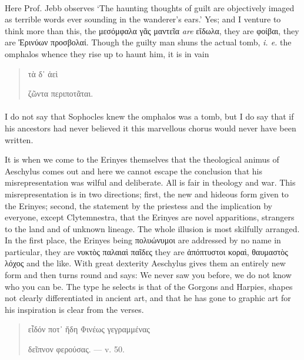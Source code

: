 \documentclass[a4paper, 11pt, oneside, polutonikogreek, english]{article}
\begin{document}
\paragraph{}
Here Prof. Jebb observes `The haunting thoughts of guilt are objectively imaged as terrible words ever sounding in the wanderer's ears.' Yes; and I venture to think more than this, the μεσόμφαλα γᾶς μαντεῖα \emph{are} εἴδωλα, they are φοίβαι, they are Ἐρινύων προσβολαί. Though the guilty man shuns the actual tomb, \emph{i. e.} the omphalos whence they rise up to haunt him, it is in vain
\begin{quotation}
\hspace*{20mm}τὰ δ᾽ ἀεὶ

ζῶντα περιποτᾶται.
\end{quotation}
\paragraph{}
I do not say that Sophocles knew the omphalos was a tomb, but I do say that if his ancestors had never believed it this marvellous chorus would never have been written.

It is when we come to the Erinyes themselves that the theological animus of Aeschylus comes out and here we cannot escape the conclusion that his misrepresentation was wilful and deliberate. All is fair in theology and war. This misrepresentation is in two directions; first, the new and hideous form given to the Erinyes; second, the statement by the priestess and the implication by everyone, except Clytemnestra, that the Erinyes are novel apparitions, strangers to the land and of unknown lineage. The whole illusion is most skilfully arranged. In the first place, the Erinyes being πολυώνυμοι are addressed by no name in particular, they are νυκτὸς παλαιαὶ παῖδες they are ἀπόπτυστοι κοραὶ, θαυμαστὸς λόχος and the like. With great dexterity Aeschylus gives them an entirely new form and then turns round and says: We never saw you before, we do not know who you can be. The type he selects is that of the Gorgons and Harpies, shapes not clearly differentiated in ancient art, and that he has gone to graphic art for his inspiration is clear from the verses.
\begin{quotation}
εἶδόν ποτ᾽ ἤδη Φινέως γεγραμμένας

δεῖπνον φερούσας. --- v. 50.
\end{quotation}
\end{document}
